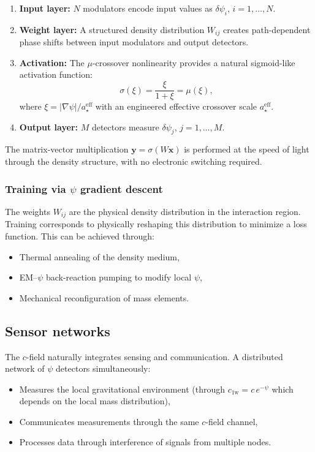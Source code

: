 \documentclass[aps,prd,twocolumn,superscriptaddress,nofootinbib,floatfix]{revtex4-2}
\newcommand{\psifield}{\psi}
\newcommand{\cfield}{c_{\text{1w}}}
\newcommand{\cvac}{c}
\begin{document}
\begin{enumerate}
\item \textbf{Input layer:} $N$ modulators encode input values as
$\delta\psifield_i$, $i = 1,\ldots,N$.

\item \textbf{Weight layer:} A structured density distribution
$W_{ij}$ creates path-dependent phase shifts between input
modulators and output detectors.

\item \textbf{Activation:} The $\mu$-crossover nonlinearity
provides a natural sigmoid-like activation function:
\begin{equation}
\sigma(\xi) = \frac{\xi}{1+\xi} = \mu(\xi),
\label{eq:activation}
\end{equation}
where $\xi = |\nabla\psifield|/a_\star^{\text{eff}}$ with an
engineered effective crossover scale $a_\star^{\text{eff}}$.

\item \textbf{Output layer:} $M$ detectors measure
$\delta\psifield_j$, $j = 1,\ldots,M$.
\end{enumerate}

The matrix-vector multiplication $\mathbf{y} = \sigma(W\mathbf{x})$
is performed at the speed of light through the density structure,
with no electronic switching required.

\subsubsection{Training via $\psifield$ gradient descent}

The weights $W_{ij}$ are the physical density distribution in the
interaction region. Training corresponds to physically reshaping
this distribution to minimize a loss function. This can be achieved
through:
\begin{itemize}
\item Thermal annealing of the density medium,
\item EM--$\psifield$ back-reaction pumping to modify local
$\psifield$,
\item Mechanical reconfiguration of mass elements.
\end{itemize}

\subsection{Sensor networks}

The $c$-field naturally integrates sensing and communication.
A distributed network of $\psifield$ detectors simultaneously:
\begin{itemize}
\item Measures the local gravitational environment (through
$\cfield = \cvac\,e^{-\psifield}$ which depends on the local
mass distribution),
\item Communicates measurements through the same $c$-field
channel,
\item Processes data through interference of signals from
multiple nodes.
\end{itemize}
\end{document}
